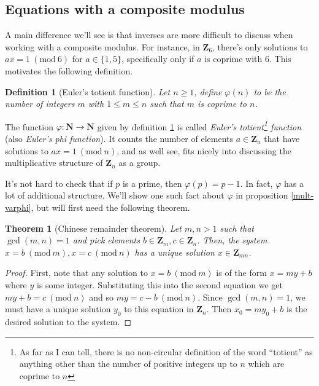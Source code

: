 \documentclass[12pt]{article}
\numberwithin{equation}{subsection}
\newtheorem{thm}[subsection]{Theorem}
\newtheorem{defn}[subsection]{Definition}
\theoremstyle{note}
\newcommand{\Mod}[1]{\ (\mathrm{mod}\ #1)}
\begin{document}
\subsection{Equations with a composite modulus}

A main difference we'll see is that inverses are more difficult to discuss when working with a composite modulus. For instance, in $\mathbf{Z}_6$, there's only solutions to $ax=1\Mod{6}$ for $a\in\{1,5\}$, specifically only if $a$ is coprime with 6. This motivates the following definition. 

\begin{defn}[Euler's totient function] \label{totient}
	Let $n\geq 1$, define $\varphi(n)$ to be the number of integers $m$ with $1\leq m\leq n$ such that $m$ is coprime to $n$. 
\end{defn}

The function $\varphi\colon \mathbf{N}\to\mathbf{N}$ given by definition \ref{totient} is called \textit{Euler's totient\footnote{As far as I can tell, there is no non-circular definition of the word ``totient'' as anything other than the number of positive integers up to $n$ which are coprime to $n$} function} (also \textit{Euler's phi function}). It counts the number of elements $a\in \mathbf{Z}_n$ that have solutions to $ax=1\Mod{n}$, and as well see, fits nicely into discussing the multiplicative structure of $\mathbf{Z}_n$ as a group. 

It's not hard to check that if $p$ is a prime, then $\varphi(p)=p-1$. In fact, $\varphi$ has a lot of additional structure. We'll show one such fact about $\varphi$ in proposition \ref{mult-varphi}, but will first need the following theorem.


\begin{thm}[Chinese remainder theorem] \label{crt}
Let $m,n>1$ such that $\gcd(m,n)=1$ and pick elements $b\in\mathbf{Z}_m,c\in\mathbf{Z}_n$. Then, the system $x=b\Mod{m},x=c\Mod{n}$ has a unique solution $x\in\mathbf{Z}_{mn}$.
\end{thm}
	
\begin{proof} First, note that any solution to $x=b\Mod{m}$ is of the form $x=my+b$ where $y$ is some integer. Substituting this into the second equation we get $my+b=c\Mod{n}$ and so $my=c-b\Mod{n}$. Since $\gcd(m,n)=1$, we must have a unique solution $y_0$ to this equation in $\mathbf{Z}_n$. Then $x_0=my_0+b$ is the desired solution to the system. 
\end{proof}
\end{document}

